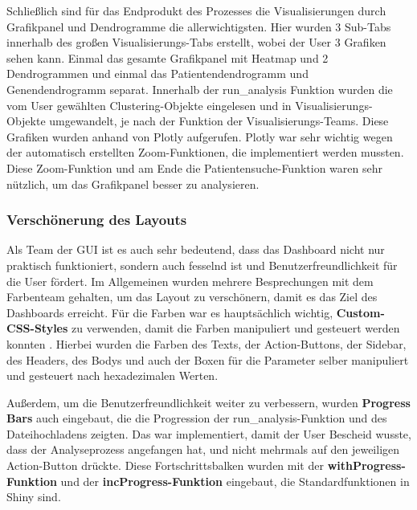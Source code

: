 \documentclass[12pt]{article}
\begin{document}
Schließlich sind für das Endprodukt des Prozesses die Visualisierungen durch Grafikpanel und Dendrogramme die allerwichtigsten. Hier wurden 3 Sub-Tabs innerhalb des großen Visualisierungs-Tabs erstellt, wobei der User 3 Grafiken sehen kann. Einmal das gesamte Grafikpanel mit Heatmap und 2 Dendrogrammen und einmal das Patientendendrogramm und Genendendrogramm separat. Innerhalb der run\_analysis Funktion wurden die vom User gewählten Clustering-Objekte eingelesen und in Visualisierungs-Objekte umgewandelt, je nach der Funktion der Visualisierungs-Teams. Diese Grafiken wurden anhand von Plotly aufgerufen. Plotly war sehr wichtig wegen der automatisch erstellten Zoom-Funktionen, die implementiert werden mussten. Diese Zoom-Funktion und am Ende die Patientensuche-Funktion waren sehr nützlich, um das Grafikpanel besser zu analysieren. 


\subsubsection{Verschönerung des Layouts}

Als Team der GUI ist es auch sehr bedeutend, dass das Dashboard nicht nur praktisch funktioniert, sondern auch fesselnd ist und Benutzerfreundlichkeit für die User fördert. Im Allgemeinen wurden mehrere Besprechungen mit dem Farbenteam gehalten, um das Layout zu verschönern, damit es das Ziel des Dashboards erreicht. Für die Farben war es hauptsächlich wichtig, \textbf{Custom-CSS-Styles} zu verwenden, damit die Farben manipuliert und gesteuert werden konnten \cite{CustomCSS}. Hierbei wurden die Farben des Texts, der Action-Buttons, der Sidebar, des Headers, des Bodys und auch der Boxen für die Parameter selber manipuliert und gesteuert nach hexadezimalen Werten. 

Außerdem, um die Benutzerfreundlichkeit weiter zu verbessern, wurden \textbf{Progress Bars} auch eingebaut, die die Progression der run\_analysis-Funktion und des Dateihochladens zeigten. Das war implementiert, damit der User Bescheid wusste, dass der Analyseprozess angefangen hat, und nicht mehrmals auf den jeweiligen Action-Button drückte. Diese Fortschrittsbalken wurden mit der \textbf{withProgress-Funktion} und der \textbf{incProgress-Funktion} eingebaut, die Standardfunktionen in Shiny sind. 
\end{document}
